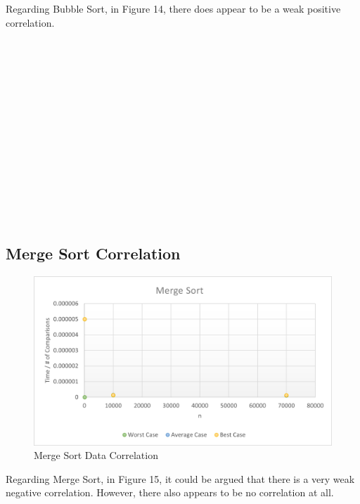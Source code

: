 \documentclass[12pt]{article}
\begin{document}
	Regarding Bubble Sort, in Figure 14, there does appear to be a weak positive correlation.\\
\\
\\
\\
\\
\\
\\
\\
\\
\\
\\
\\\\\\\\
\subsection{Merge Sort Correlation} 
\begin{figure}[h]
	\centering
	\includegraphics[width=\textwidth]{Mcorr.png}
\caption{Merge Sort Data Correlation}
    \label{fig:mesh1}
\end{figure}
	Regarding Merge Sort, in Figure 15, it could be argued that there is a very weak negative correlation. However, there also appears to be no correlation at all.\\
\\
\\
\\
\\
\\
\\
\\
\\
\\
\\
\\
\\
\\
\\
\end{document}
